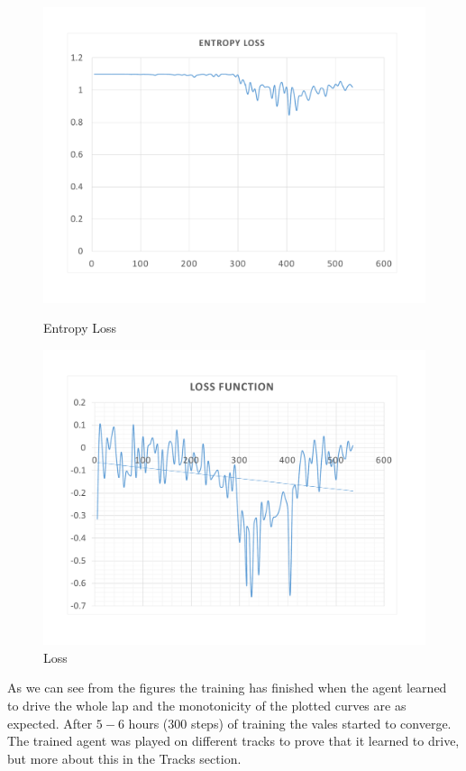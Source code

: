 \begin{figure}[H]
	\includegraphics[width=\linewidth]{Figures/EntropyLoss}
	\caption{Entropy Loss}\label{fig:EntropyLoss}
	\endminipage\hfill
	\includegraphics[width=\linewidth]{Figures/Loss}
	\caption{Loss}\label{fig:Loss}
	\endminipage
\end{figure}

As we can see from the figures the training has finished when the agent learned to drive the whole lap and the monotonicity of the plotted curves are as expected. After $5-6$ hours ($300$ steps) of training the vales started to converge. The trained agent was played on different tracks to prove that it learned to drive, but more about this in the Tracks section.

